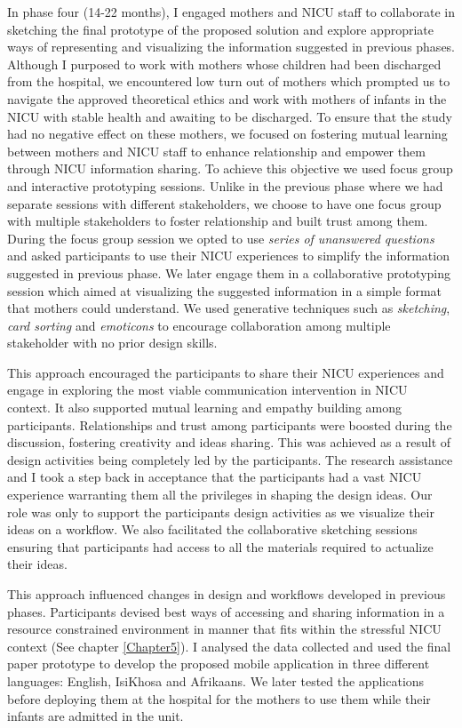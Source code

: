 In phase four (14-22 months), I engaged mothers and NICU staff to collaborate in sketching the final prototype of the proposed solution and explore appropriate ways of representing and visualizing the information suggested in previous phases. Although I purposed to work with mothers whose children had been discharged from the hospital, we encountered low turn out of mothers which prompted us to navigate the approved theoretical ethics and work with mothers of infants in the NICU with stable health and awaiting to be discharged. To ensure that the study had no negative effect on these mothers, we focused on fostering mutual learning between mothers and NICU staff to enhance relationship and empower them through NICU information sharing. To achieve this objective we used focus group and interactive prototyping sessions. Unlike in the previous phase where we had separate sessions with different stakeholders, we choose to have one focus group with multiple stakeholders to foster relationship and built trust among them. During the focus group session we opted to use \textit{series of unanswered questions} and asked participants to use their NICU experiences to simplify the information suggested in previous phase. We later engage them in a collaborative prototyping session which aimed at visualizing the suggested information in a simple format that mothers could understand. We used generative techniques such as \textit{sketching}, \textit{card sorting} and \textit{emoticons} to encourage collaboration among multiple stakeholder with no prior design skills.

This approach encouraged the participants to share their NICU experiences and engage in exploring the most viable communication intervention in NICU context. It also supported mutual learning and empathy building among participants. Relationships and trust among participants were boosted during the discussion, fostering creativity and ideas sharing. This was achieved as a result of design activities being completely led by the participants. The research assistance and I took a step back in acceptance that the participants had a vast NICU experience warranting them all the privileges in shaping the design ideas. Our role was only to support the participants design activities as we visualize their ideas on a workflow. We also facilitated the collaborative sketching sessions ensuring that participants had access to all the materials required to actualize their ideas. 

This approach influenced changes in design and workflows developed in previous phases. Participants devised best ways of accessing and sharing information in a resource constrained environment in manner that fits within the stressful NICU context (See chapter \ref{Chapter5}). I analysed the data collected and used the final paper prototype to develop the proposed mobile application in three different languages: English, IsiKhosa and Afrikaans. We later tested the applications before deploying them at the hospital for the mothers to use them while their infants are admitted in the unit.

